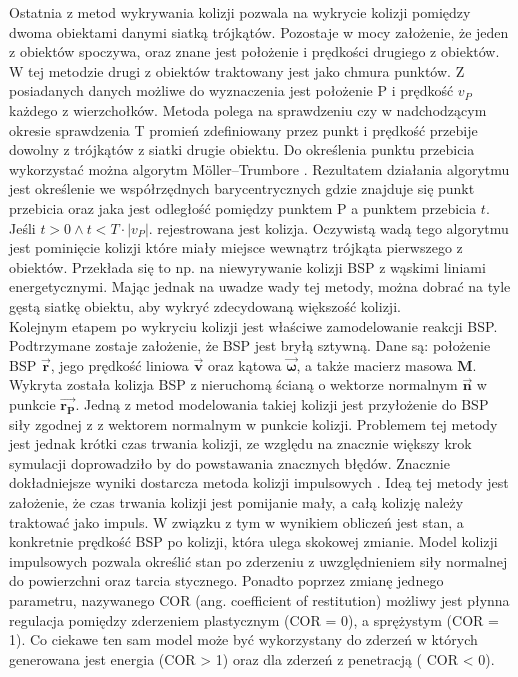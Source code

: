 Ostatnia z metod wykrywania kolizji pozwala na wykrycie kolizji pomiędzy dwoma obiektami danymi siatką trójkątów. Pozostaje w mocy założenie, że jeden z obiektów spoczywa, oraz znane jest położenie i prędkości drugiego z obiektów. W tej metodzie drugi z obiektów traktowany jest jako chmura punktów. Z posiadanych danych możliwe do wyznaczenia jest położenie P i prędkość $v_P$ każdego z wierzchołków. Metoda polega na sprawdzeniu czy w nadchodzącym okresie sprawdzenia T promień zdefiniowany przez punkt i prędkość przebije dowolny z trójkątów z siatki drugie obiektu. Do określenia punktu przebicia wykorzystać można algorytm Möller–Trumbore \cite{ray_intersaction}. Rezultatem działania algorytmu jest określenie we współrzędnych barycentrycznych gdzie znajduje się punkt przebicia oraz jaka jest odległość pomiędzy punktem P a punktem przebicia $t$. Jeśli $t > 0 \land t < T\cdot |v_P|$. rejestrowana jest kolizja. Oczywistą wadą tego algorytmu jest pominięcie kolizji które miały miejsce wewnątrz trójkąta pierwszego z obiektów. Przekłada się to np. na niewyrywanie kolizji BSP z wąskimi liniami energetycznymi. Mając jednak na uwadze wady tej metody, można dobrać na tyle gęstą siatkę obiektu, aby wykryć zdecydowaną większość kolizji.\\


Kolejnym etapem po wykryciu kolizji jest właściwe zamodelowanie reakcji BSP. Podtrzymane zostaje założenie, że BSP jest bryłą sztywną.  Dane są: położenie BSP $\bm{\vec{r}}$, jego prędkość liniowa $\bm{\vec{v}}$ oraz kątowa $\bm{\vec{\omega}}$, a także macierz masowa $\bm{M}$. Wykryta została kolizja BSP z nieruchomą ścianą o wektorze normalnym $\bm{\vec{n}}$ w punkcie $\bm{\vec{r_P}}$. Jedną z metod modelowania takiej kolizji jest przyłożenie do BSP siły zgodnej z z wektorem normalnym w punkcie kolizji. Problemem tej metody jest jednak krótki czas trwania kolizji, ze względu na znacznie większy krok symulacji doprowadziło by do powstawania znacznych błędów. Znacznie dokładniejsze wyniki dostarcza metoda kolizji impulsowych \cite{impulse_collision}. Ideą tej metody jest założenie, że czas trwania kolizji jest pomijanie mały, a całą kolizję należy traktować jako impuls. W związku z tym w wynikiem obliczeń jest stan, a konkretnie prędkość BSP po kolizji, która ulega skokowej zmianie. Model kolizji impulsowych pozwala określić stan po zderzeniu z uwzględnieniem siły normalnej do powierzchni oraz tarcia stycznego. Ponadto poprzez zmianę jednego parametru, nazywanego COR (ang. coefficient of restitution) możliwy jest płynna regulacja pomiędzy zderzeniem plastycznym (COR = 0), a sprężystym (COR = 1). Co ciekawe ten sam model może być wykorzystany do zderzeń w których generowana jest energia (COR > 1) oraz dla zderzeń z penetracją ( COR < 0).\\

